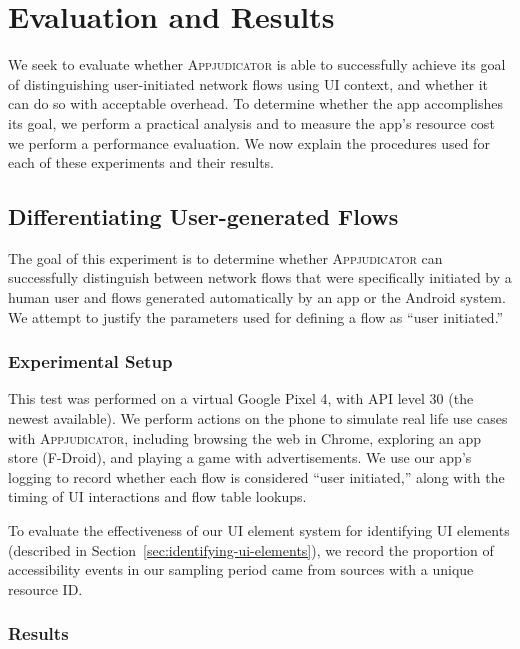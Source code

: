 \section{Evaluation and Results}
\label{sec:evaluation-and-results}

We seek to evaluate whether \textsc{Appjudicator} is able to successfully
achieve its goal of distinguishing user-initiated network flows using UI
context, and whether it can do so with acceptable overhead. To determine whether
the app accomplishes its goal, we perform a practical analysis and to measure the
app's resource cost we perform a performance evaluation. We now explain the
procedures used for each of these experiments and their results.

\subsection{Differentiating User-generated Flows}
\label{sec:differentiating-user-generated-flows}

The goal of this experiment is to determine whether \textsc{Appjudicator} can
successfully distinguish between network flows that were specifically initiated
by a human user and flows generated automatically by an app or the Android
system. We attempt to justify the parameters used for defining a flow as ``user
initiated.''

\subsubsection{Experimental Setup}
\label{sec:experimental-setup}

This test was performed on a virtual Google Pixel 4, with API level 30 (the
newest available). We perform actions on the phone to simulate real life use
cases with \textsc{Appjudicator}, including browsing the web in Chrome,
exploring an app store (F-Droid), and playing a game with advertisements. We use
our app's logging to record whether each flow is considered ``user initiated,''
along with the timing of UI interactions and flow table lookups.

To evaluate the effectiveness of our UI element system for identifying UI
elements (described in Section~\ref{sec:identifying-ui-elements}), we record
the proportion of accessibility events in our sampling period came from sources
with a unique resource ID.

\subsubsection{Results}
\label{sec:practical-results}

